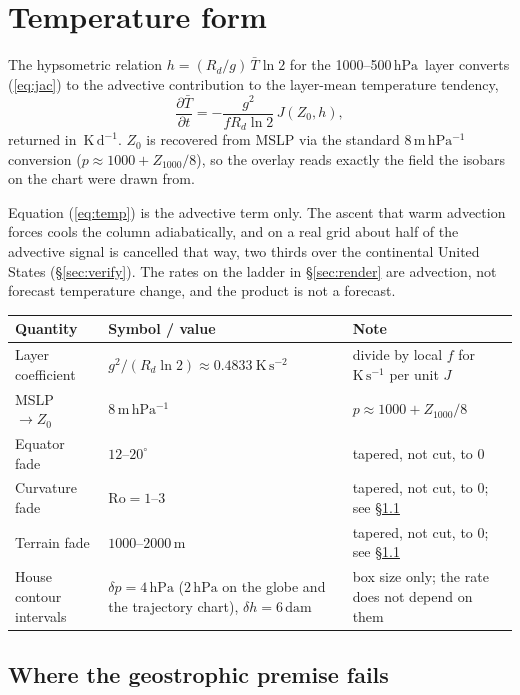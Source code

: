 \documentclass[11pt]{article}
\newcommand{\hPa}{\ensuremath{\,\mathrm{hPa}}}
\newcommand{\dam}{\ensuremath{\,\mathrm{dam}}}
\newcommand{\Kday}{\ensuremath{\,\mathrm{K\,d^{-1}}}}
\begin{document}
\section{Temperature form}
\label{sec:temp}

The hypsometric relation $h = (R_d/g)\,\bar{T}\ln 2$ for the 1000--500\hPa\ layer converts (\ref{eq:jac}) to the advective contribution to the layer-mean temperature tendency,
\begin{equation}
\frac{\partial \bar{T}}{\partial t} = -\frac{g^2}{f R_d \ln 2}\,J(Z_0,h),
\label{eq:temp}
\end{equation}
returned in $\Kday$. $Z_0$ is recovered from MSLP via the standard $8\,\mathrm{m\,hPa^{-1}}$ conversion ($p \approx 1000 + Z_{1000}/8$), so the overlay reads exactly the field the isobars on the chart were drawn from.

Equation (\ref{eq:temp}) is the advective term only. The ascent that warm advection forces cools the column adiabatically, and on a real grid about half of the advective signal is cancelled that way, two thirds over the continental United States (\S\ref{sec:verify}). The rates on the ladder in \S\ref{sec:render} are advection, not forecast temperature change, and the product is not a forecast.

\begin{center}
\small\begin{tabular}{@{}lp{}p{}@{}}
\toprule
Quantity & Symbol / value & Note \\
\midrule
Layer coefficient & $g^2/(R_d\ln 2) \approx 0.4833\ \mathrm{K\,s^{-2}}$ & divide by local $f$ for $\mathrm{K\,s^{-1}}$ per unit $J$ \\
MSLP $\to Z_0$ & $8\,\mathrm{m\,hPa^{-1}}$ & $p \approx 1000 + Z_{1000}/8$ \\
Equator fade & $12$--$20^\circ$ & tapered, not cut, to 0 \\
Curvature fade & $\mathrm{Ro} = 1$--$3$ & tapered, not cut, to 0; see \S\ref{sec:limits} \\
Terrain fade & $1000$--$2000$\,m & tapered, not cut, to 0; see \S\ref{sec:limits} \\
House contour intervals & $\delta p = 4\hPa$ ($2\hPa$ on the globe and the trajectory chart), $\delta h = 6\dam$ & box size only; the rate does not depend on them \\
\bottomrule
\end{tabular}
\end{center}

\subsection{Where the geostrophic premise fails}
\label{sec:limits}
\end{document}
